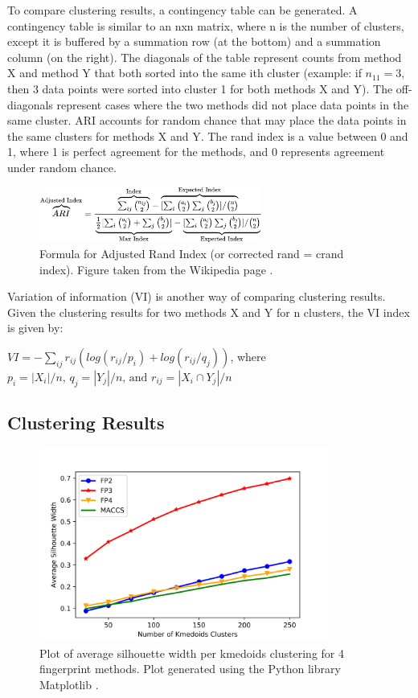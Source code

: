 \documentclass[11pt]{article}
\begin{document}
To compare clustering results, a contingency table can be generated. A contingency table is similar to an nxn matrix, where n is the number of clusters, except it is buffered by a summation row (at the bottom) and a summation column (on the right). The diagonals of the table represent counts from method X and method Y that both sorted into the same ith cluster (example: if $n_{11} = 3$, then 3 data points were sorted into cluster 1 for both methods X and Y). The off-diagonals represent cases where the two methods did not place data points in the same cluster. ARI accounts for random chance that may place the data points in the same clusters for methods X and Y. The rand index is a value between 0 and 1, where 1 is perfect agreement for the methods, and 0 represents agreement under random chance.

\begin{figure}[H]
    \centering
    \includegraphics[width=0.65\textwidth]{ari-formula.png}
    \caption{Formula for Adjusted Rand Index (or corrected rand = crand index). Figure taken from the Wikipedia page \cite{ari-formula}.}
    \label{fig:my_label}
\end{figure}

Variation of information (VI) is another way of comparing clustering results. Given the clustering results for two methods X and Y for n clusters, the VI index is given by:

$VI = -\sum\limits_{ij}r_{ij} \left(log(r_{ij}/p_i) + log(r_{ij}/q_j)\right)$, where $p_i = |X_i|/n \text{, } q_j = |Y_j|/n \text{, and } r_{ij} = |X_i \cap Y_j|/n$

\subsection{Clustering Results}

\begin{figure}[H]
\centering
\includegraphics[width=0.85\textwidth]{silwidths_kmed.png}
\caption{Plot of average silhouette width per kmedoids clustering for 4 fingerprint methods. Plot generated using the Python library Matplotlib \cite{matplotlib}.}
\label{silwidths}
\end{figure}
\end{document}
